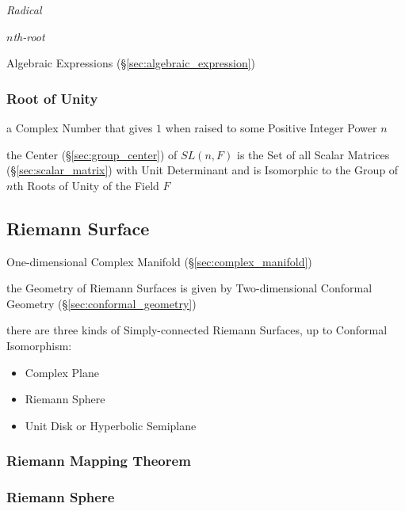 \emph{Radical}

\emph{$n$th-root}

Algebraic Expressions (\S\ref{sec:algebraic_expression})



\subsubsection{Root of Unity}\label{sec:unity_root}

a Complex Number that gives $1$ when raised to some Positive Integer Power $n$

the Center (\S\ref{sec:group_center}) of $SL(n,F)$ is the Set of all Scalar
Matrices (\S\ref{sec:scalar_matrix}) with Unit Determinant and is Isomorphic to
the Group of $n$th Roots of Unity of the Field $F$



\subsection{Riemann Surface}\label{sec:riemann_surface}

One-dimensional Complex Manifold (\S\ref{sec:complex_manifold})

the Geometry of Riemann Surfaces is given by Two-dimensional Conformal
Geometry (\S\ref{sec:conformal_geometry})

there are three kinds of Simply-connected Riemann Surfaces, up to Conformal
Isomorphism:
\begin{itemize}
  \item Complex Plane
  \item Riemann Sphere
  \item Unit Disk or Hyperbolic Semiplane
\end{itemize}



\subsubsection{Riemann Mapping Theorem}
\label{sec:riemann_mapping_theorem}

\subsubsection{Riemann Sphere}\label{sec:riemann_sphere}


